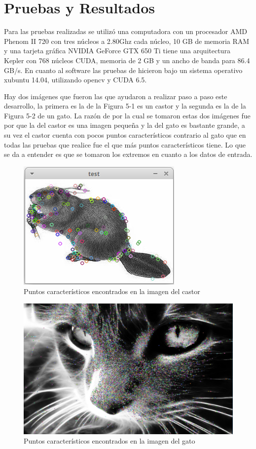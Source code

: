 

\chapter{Pruebas y Resultados}

Para las pruebas realizadas se utilizó una computadora con un procesador AMD Phenom II 720 con tres núcleos a 2.80Ghz cada núcleo, 10 GB de memoria RAM y una tarjeta gráfica NVIDIA GeForce GTX 650 Ti tiene una arquitectura Kepler con 768 núcleos CUDA, memoria de 2 GB y un ancho de banda para 86.4 GB/s. En cuanto al software las pruebas de hicieron bajo un sistema operativo xubuntu 14.04, utilizando opencv y CUDA 6.5.

Hay dos imágenes que fueron las que ayudaron a realizar paso a paso este desarrollo, la primera es la de la Figura 5-1 es un castor y la segunda es la de la Figura 5-2 de un gato. La razón de por la cual se tomaron estas dos imágenes fue por que la del castor es una imagen pequeña y la del gato es bastante grande, a su vez el castor cuenta con pocos puntos característicos contrario al gato que en todas las pruebas que realice fue el que más puntos característicos tiene. Lo que se da a entender es que se tomaron los extremos en cuanto a los datos de entrada. 

\begin{figure}[ph]
			\centering
				\includegraphics[scale=1]{img/castor.png}
			\caption{Puntos característicos encontrados en la imagen del castor}
\end{figure}


\begin{figure}[ph]
			\centering
				\includegraphics[scale=0.25]{img/gato.png}
			\caption{Puntos característicos encontrados en la imagen del gato}
\end{figure}


